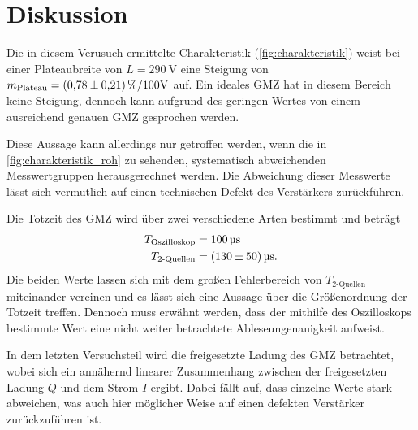 \section{Diskussion}
\label{sec:Diskussion}
Die in diesem Verusuch ermittelte Charakteristik (\autoref{fig:charakteristik}) weist bei einer Plateaubreite
von $L=\qty{290}{\volt}$ eine Steigung von $m_{\text{Plateau}} = \qty{0.78+-0.21}{\percent\per100\volt}$
auf. Ein ideales GMZ hat in diesem Bereich keine Steigung, dennoch kann aufgrund des geringen Wertes von einem ausreichend
genauen GMZ gesprochen werden.

Diese Aussage kann allerdings nur getroffen werden, wenn die in \autoref{fig:charakteristik_roh} zu sehenden, systematisch 
abweichenden Messwertgruppen herausgerechnet werden. Die Abweichung dieser Messwerte lässt sich vermutlich auf einen
technischen Defekt des Verstärkers zurückführen.

Die Totzeit des GMZ wird über zwei verschiedene Arten bestimmt und beträgt
\begin{align*}
    T_{\text{Oszilloskop}} &= \qty{100}{\micro\second} \\
    T_{\text{2-Quellen}} &= \qty{130+-50}{\micro\second}.
\end{align*}
Die beiden Werte lassen sich mit dem großen Fehlerbereich von $T_{\text{2-Quellen}}$ miteinander vereinen und es lässt sich eine Aussage 
über die Größenordnung der Totzeit treffen. Dennoch muss erwähnt werden, dass der mithilfe des Oszilloskops bestimmte Wert
eine nicht weiter betrachtete Ableseungenauigkeit aufweist.

In dem letzten Versuchsteil wird die freigesetzte Ladung des GMZ betrachtet, wobei sich ein annähernd linearer Zusammenhang
zwischen der freigesetzten Ladung $Q$ und dem Strom $I$ ergibt. Dabei fällt auf, dass einzelne Werte stark abweichen, was auch
hier möglicher Weise auf einen defekten Verstärker zurückzuführen ist.